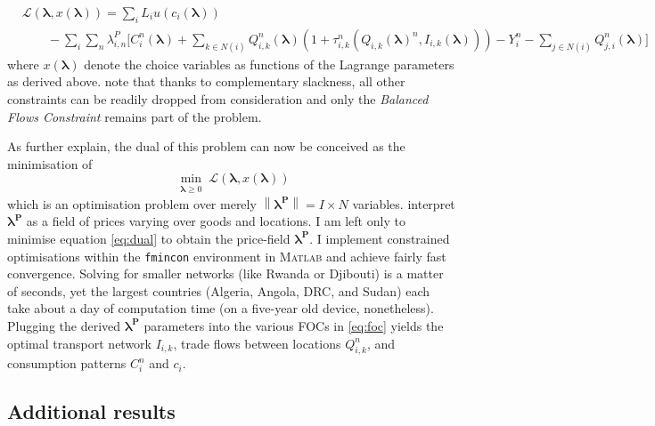 \documentclass[11pt, oneside]{article}   	%
\begin{document}
\begin{equation}
  \label{eq:dual}
  \begin{aligned}
    & \mathcal{L}(\bm{\lambda}, x(\bm{\lambda})) = \sum_{i}^{} L_{i}u(c_{i}(\bm{\lambda})) \\
  & \qquad - \sum_{i}^{}\sum_{n}^{}\lambda^{P}_{i,n}\bigg[ C_{i}^{n}(\bm{\lambda}) + \sum_{k\in N(i)}^{}Q_{i,k}^{n}(\bm{\lambda})(1+\tau_{i,k}^{n}(Q_{i,k}(\bm{\lambda})^{n}, I_{i,k}(\bm{\lambda}))) - Y_{i}^{n} - \sum_{j\in N(i)}^{}Q_{j,i}^{n}(\bm{\lambda}) \bigg]
  \end{aligned}
\end{equation}
where $x(\bm{\lambda})$ denote the choice variables as functions of the Lagrange parameters as derived above. \citeauthor{fajgelbaum_optimal_2017} note that thanks to complementary slackness, all other constraints can be readily dropped from consideration and only the \emph{Balanced Flows Constraint} remains part of the problem.

As \citeauthor{fajgelbaum_optimal_2017} further explain, the dual of this problem can now be conceived as the minimisation of
\begin{equation*}
  \!\min_{\substack{\bm{\lambda} \geq 0}}\mathcal{L}(\bm{\lambda}, x(\bm{\lambda}))
\end{equation*}
which is an optimisation problem over merely $\left\lVert\bm{\lambda^{P}}\right\rVert = I \times N$ variables. \citeauthor{fajgelbaum_optimal_2017} interpret $\bm{\lambda^{P}}$ as a field of prices varying over goods and locations. I am left only to minimise equation \eqref{eq:dual} to obtain the price-field $\bm{\lambda^{P}}$. I implement constrained optimisations within the \texttt{fmincon} environment in \textsc{Matlab} and achieve fairly fast convergence. Solving for smaller networks (like Rwanda or Djibouti) is a matter of seconds, yet the largest countries (Algeria, Angola, DRC, and Sudan) each take about a day of computation time (on a five-year old device, nonetheless). Plugging the derived $\bm{\lambda^{P}}$ parameters into the various FOCs in \eqref{eq:foc} yields the optimal transport network $I_{i,k}$, trade flows between locations $Q_{i,k}^{n}$, and consumption patterns $C_{i}^{n}$ and $c_{i}$.

\vfill
  \subsection{Additional results}
\end{document}
